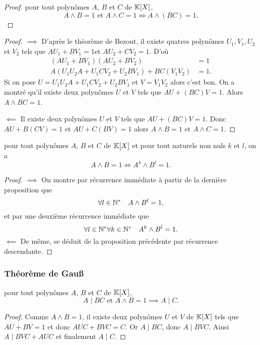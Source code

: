 \begin{proof}
  pour tout polynômes \(A\), \(B\) et \(C\) de \(\mathbb{K}[X]\),
  \begin{equation}
    A \wedge B =1 \text{~et~} A \wedge C=1 \iff A \wedge (BC) =1.
  \end{equation}
\end{proof}
\begin{proof}
  \(\implies\) D'après le théorème de Bezout, il existe quatres polynômes \(U_1,V_1,U_2\) et \(V_2\) tels que \(AU_1+BV_1=1\)et \(AU_2+CV_2=1\). D'où
  \begin{align}
    (AU_1+BV_1)(AU_2+BV_2)&=1\\
    A(U_1U_2A+U_1CV_2+U_2BV_1)+BC(V_1V_2)&=1.
  \end{align}
  Si on pose \(U=U_1U_2A+U_1CV_2+U_2BV_1\) et \(V=V_1V_2\) alors c'est bon. On a montré qu'il existe deux polynômes \(U\) et \(V\) tels que \(AU+(BC)V=1\). Alors \(A \wedge BC=1\).

  \(\impliedby\) Il existe deux polynômes \(U\) et \(V\) tels que \(AU+(BC)V=1\). Donc \(AU+B(CV)=1\) et \(AU+C(BV)=1\) alors \(A \wedge B=1\) et \(A \wedge C=1\).
\end{proof}

\begin{prop}
  pour tout polynômes \(A\), \(B\) et \(C\) de \(\mathbb{K}[X]\) et pour tout naturels non nuls \(k\) et \(l\), on a
  \begin{equation}
    A \wedge B =1 \iff A^k \wedge B^l = 1.
  \end{equation}
\end{prop}
\begin{proof}
  \(\implies\) On montre par récurrence immédiate à partir de la dernière proposition que
  \begin{equation}
    \forall l \in \mathbb{N}^* \quad A \wedge B^l = 1,
  \end{equation}
  et par une deuxième récurrence immédiate que
  \begin{equation}
    \forall l \in \mathbb{N}^* \forall k \in \mathbb{N}^* \quad A^k \wedge B^l = 1.
  \end{equation}
  \(\impliedby\)  De même, se déduit de la proposition précédente par récurrence descendante.
\end{proof}

\subsubsection{Théorème de Gau\ss}

\begin{theo}
  pour tout polynômes \(A\), \(B\) et \(C\) de \(\mathbb{K}[X]\),
  \begin{equation}
    A\mid{}BC \text{~et~} A\wedge B=1 \implies A\mid{}C.
  \end{equation}
\end{theo}
\begin{proof}
  Comme \(A \wedge B=1\), il existe deux polynômes \(U\) et \(V\) de \(\mathbb{K}[X]\) tels que \(AU+BV=1\) et donc \(AUC+BVC=C\). Or \(A\mid{}BC\), donc \(A\mid{}BVC\). Ainsi \(A\mid{}BVC+AUC\) et finalement \(A\mid{}C\).
\end{proof}

